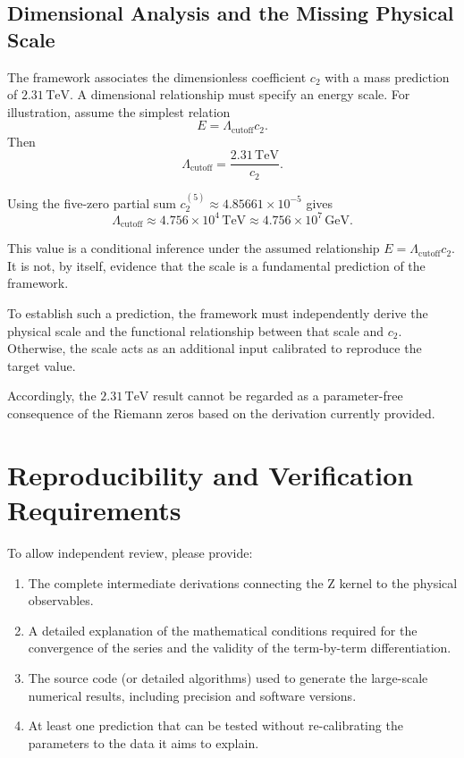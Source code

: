 \documentclass[11pt,a4paper]{article}
\begin{document}
\subsection{Dimensional Analysis and the Missing Physical Scale}
The framework associates the dimensionless coefficient $c_2$ with a mass prediction of $2.31\,\mathrm{TeV}$. A dimensional relationship must specify an energy scale. For illustration, assume the simplest relation
\[
    E=\Lambda_{\mathrm{cutoff}}c_2.
\]
Then
\[
    \Lambda_{\mathrm{cutoff}} =\frac{2.31\,\mathrm{TeV}}{c_2}.
\]

Using the five-zero partial sum $c_2^{(5)}\approx4.85661\times10^{-5}$ gives
\[
    \Lambda_{\mathrm{cutoff}} \approx4.756\times10^4\,\mathrm{TeV} \approx4.756\times10^7\,\mathrm{GeV}.
\]

This value is a conditional inference under the assumed relationship $E=\Lambda_{\mathrm{cutoff}}c_2$. It is not, by itself, evidence that the scale is a fundamental prediction of the framework.

To establish such a prediction, the framework must independently derive the physical scale and the functional relationship between that scale and $c_2$. Otherwise, the scale acts as an additional input calibrated to reproduce the target value.

Accordingly, the $2.31\,\mathrm{TeV}$ result cannot be regarded as a parameter-free consequence of the Riemann zeros based on the derivation currently provided.

\section{Reproducibility and Verification Requirements}
To allow independent review, please provide:
\begin{enumerate}
    \item The complete intermediate derivations connecting the Z kernel to the physical observables.
    \item A detailed explanation of the mathematical conditions required for the convergence of the series and the validity of the term-by-term differentiation.
    \item The source code (or detailed algorithms) used to generate the large-scale numerical results, including precision and software versions.
    \item At least one prediction that can be tested without re-calibrating the parameters to the data it aims to explain.
\end{enumerate}
\end{document}
